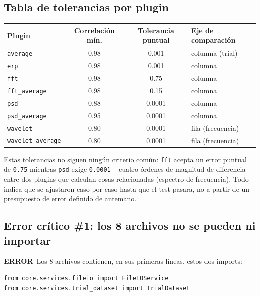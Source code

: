 \documentclass[11pt,a4paper]{article}
\newcommand{\errmark}{\textcolor{critico}{\textbf{ERROR}}}
\begin{document}
\subsection{Tabla de tolerancias por plugin}

\begin{center}
\begin{tabular}{lccl}
\toprule
\textbf{Plugin} & \textbf{Correlación mín.} & \textbf{Tolerancia puntual} & \textbf{Eje de comparación} \\
\midrule
\texttt{average}         & 0.98 & 0.001  & columna (trial) \\
\texttt{erp}              & 0.98 & 0.001  & columna \\
\texttt{fft}              & 0.98 & 0.75   & columna \\
\texttt{fft\_\allowbreak average}     & 0.98 & 0.15   & columna \\
\texttt{psd}              & 0.88 & 0.0001 & columna \\
\texttt{psd\_\allowbreak average}     & 0.95 & 0.0001 & columna \\
\texttt{wavelet}          & 0.80 & 0.0001 & fila (frecuencia) \\
\texttt{wavelet\_\allowbreak average} & 0.80 & 0.0001 & fila (frecuencia) \\
\bottomrule
\end{tabular}
\end{center}

Estas tolerancias no siguen ningún criterio común: \texttt{fft} acepta un error puntual de \texttt{0.75}
mientras \texttt{psd} exige \texttt{0.0001} -- cuatro órdenes de magnitud de diferencia entre dos plugins que
calculan cosas relacionadas (espectro de frecuencia). Todo indica que se ajustaron caso por caso hasta que el
test pasara, no a partir de un presupuesto de error definido de antemano.

\subsection{Error crítico \#1: los 8 archivos no se pueden ni importar}
\label{sec:import-error}

\errmark\ Los 8 archivos contienen, en sus primeras líneas, estos dos imports:

\begin{verbatim}
from core.services.fileio import FileIOService
from core.services.trial_dataset import TrialDataset
\end{verbatim}
\end{document}

